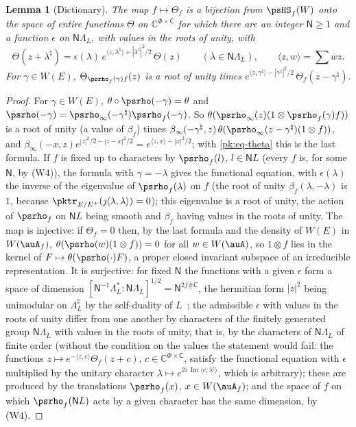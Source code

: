 \documentclass[10pt]{amsart}
\newtheorem{lemma}[theorem]{Lemma}
\theoremstyle{definition}
\theoremstyle{remark}
\newcommand{\C}{\mathbb C}
\newcommand{\Iml}{\operatorname{Im}}
\providecommand{\auPl}{\Phi}
\providecommand{\aubar}[1]{\overline{#1}}
\begin{document}
\begin{lemma}[Dictionary]\label{pk:dict}
The map $f\mapsto\Theta_f$ is a bijection from $\psHS_f(W)$ onto the space of entire functions
$\Theta$ on $\C^{\auPl\times\mathsf C}$ for which there are an integer $\mathsf N\ge1$ and a function
$\epsilon$ on $\mathsf N\Lambda_L$, with values in the roots of unity, with
\[
\Theta(z+\lambda^\natural)=\epsilon(\lambda)\,e^{\langle z,\lambda^\natural\rangle+|\lambda^\natural|^2
/2}\,\Theta(z)\qquad(\lambda\in\mathsf N\Lambda_L),\qquad\langle z,w\rangle=\sum\aubar w z .
\]
For $\gamma\in W(E)$, $\Theta_{\psrho_f(\gamma)f}(z)$ is a root of unity times
$e^{\langle z,\gamma^\natural\rangle-|\gamma^\natural|^2/2}\,\Theta_f(z-\gamma^\natural)$.
\end{lemma}
\begin{proof}
For $\gamma\in W(E)$, $\theta\circ\psrho(-\gamma)=\theta$ and $\psrho(-\gamma)=\psrho_\infty(
-\gamma^\natural)\psrho_f(-\gamma)$. So $\theta(\psrho_\infty(z)(1\otimes\psrho_f(\gamma)f))$ is a
root of unity (a value of $\beta_f$) times $\beta_\infty(-\gamma^\natural,z)\,\theta(\psrho_\infty(z-
\gamma^\natural)(1\otimes f))$, and $\beta_\infty(-x,z)e^{|z|^2/2-|z-x|^2/2}=e^{\langle z,x\rangle-
|x|^2/2}$; with \eqref{pk:eq-theta} this is the last formula. If $f$ is fixed up to characters by
$\psrho_f(l)$, $l\in\mathsf NL$ (every $f$ is, for some $\mathsf N$, by (W4)), the formula with
$\gamma=-\lambda$ gives the functional equation, with $\epsilon(\lambda)$ the inverse of the
eigenvalue of $\psrho_f(\lambda)$ on $f$ (the root of unity $\beta_f(\lambda,-\lambda)$ is $1$,
because $\pktr_{E/E^+}(\jmath\langle\lambda,\lambda\rangle)=0$); this eigenvalue is a root of unity,
the action of $\psrho_f$ on $\mathsf NL$ being smooth and $\beta_f$ having values in the roots of
unity. The map is injective: if $\Theta_f=0$ then, by
the last formula and the density of $W(E)$ in $W(\auA_f)$, $\theta(\psrho(w)(1\otimes f))=0$ for
all $w\in W(\auA)$, so $1\otimes f$ lies in the kernel of $F\mapsto\theta(\psrho(\cdot)F)$, a
proper closed invariant subspace of an irreducible representation. It is surjective: for fixed
$\mathsf N$ the functions with a given $\epsilon$ form a space of dimension
$[\mathsf N^{-1}\Lambda_L^{*}:\mathsf N\Lambda_L]^{1/2}=\mathsf N^{2f\#\mathsf C}$, the hermitian form
$|z|^2$ being unimodular on $\Lambda_L^\natural$ by the self-duality of
$L$~\cite[\S3, Proposition, p.~26]{MumfordAV}; the admissible $\epsilon$ with values in the roots
of unity differ from one another by characters of the finitely generated group
$\mathsf N\Lambda_L$ with values in the roots of unity, that is, by the characters of
$\mathsf N\Lambda_L$ of finite order (without the condition on the values the statement would
fail: the functions $z\mapsto e^{-\langle z,c\rangle}\Theta_f(z+c)$, $c\in\C^{\auPl\times\mathsf C}$,
satisfy the functional equation with $\epsilon$ multiplied by the unitary character
$\lambda\mapsto e^{2i\,\Iml\langle c,\lambda^\natural\rangle}$, which is arbitrary);
these are produced by the translations
$\psrho_f(x)$, $x\in W(\auA_f)$; and the space of $f$ on which $\psrho_f(\mathsf NL)$ acts by a
given character has the same dimension, by (W4).
\end{proof}
\end{document}
